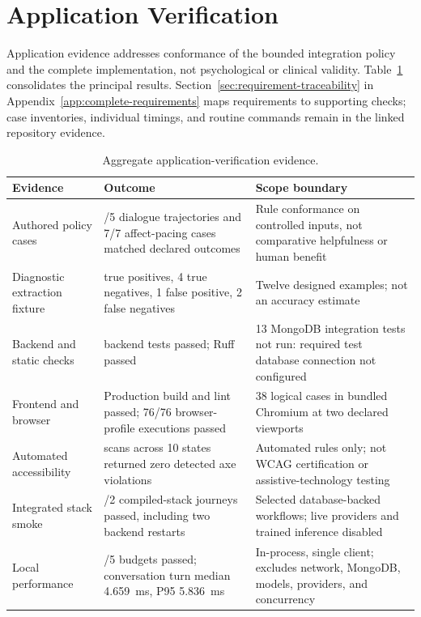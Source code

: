 \section{Application Verification}
\label{sec:engineering-evaluation}

Application evidence addresses conformance of the bounded integration policy and the complete implementation, not psychological or clinical validity. Table~\ref{tab:application-verification} consolidates the principal results. Section~\ref{sec:requirement-traceability} in Appendix~\ref{app:complete-requirements} maps requirements to supporting checks; case inventories, individual timings, and routine commands remain in the linked repository evidence.

\begin{table}[htbp]
\centering
\caption{Aggregate application-verification evidence.}
\label{tab:application-verification}
\footnotesize
\setlength{\tabcolsep}{4pt}
\begin{tabularx}{\textwidth}{|>{\raggedright\arraybackslash}p{}|>{\raggedright\arraybackslash}p{}|X|}
\hline
\textbf{Evidence} & \textbf{Outcome} & \textbf{Scope boundary} \\ \hline
Authored policy cases & 5/5 dialogue trajectories and 7/7 affect-pacing cases matched declared outcomes & Rule conformance on controlled inputs, not comparative helpfulness or human benefit \\ \hline
Diagnostic extraction fixture & 5 true positives, 4 true negatives, 1 false positive, 2 false negatives & Twelve designed examples; not an accuracy estimate \\ \hline
Backend and static checks & 245 backend tests passed; Ruff passed & 13 MongoDB integration tests not run: required test database connection not configured \\ \hline
Frontend and browser & Production build and lint passed; 76/76 browser-profile executions passed & 38 logical cases in bundled Chromium at two declared viewports \\ \hline
Automated accessibility & 20 scans across 10 states returned zero detected axe violations & Automated rules only; not WCAG certification or assistive-technology testing \\ \hline
Integrated stack smoke & 2/2 compiled-stack journeys passed, including two backend restarts & Selected database-backed workflows; live providers and trained inference disabled \\ \hline
Local performance & 5/5 budgets passed; conversation turn median 4.659~ms, P95 5.836~ms & In-process, single client; excludes network, MongoDB, models, providers, and concurrency \\ \hline
\end{tabularx}
\end{table}

